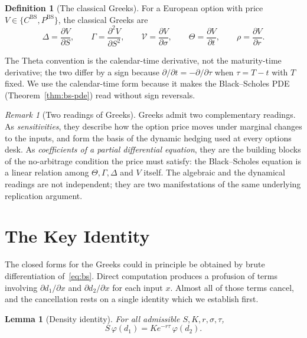 \documentclass[11pt,a4paper]{article}
\theoremstyle{plain}
\newtheorem{lemma}[theorem]{Lemma}
\theoremstyle{definition}
\newtheorem{definition}[theorem]{Definition}
\theoremstyle{remark}
\newtheorem{remark}[theorem]{Remark}
\newcommand{\BS}{\mathrm{BS}}
\newcommand{\Vega}{\mathcal{V}}
\begin{document}
\begin{definition}[The classical Greeks]
For a European option with price \(V \in \{C^{\BS}, P^{\BS}\}\), the
classical Greeks are
\[
    \Delta = \frac{\partial V}{\partial S},
    \qquad
    \Gamma = \frac{\partial^2 V}{\partial S^2},
    \qquad
    \Vega = \frac{\partial V}{\partial \sigma},
    \qquad
    \Theta = \frac{\partial V}{\partial t},
    \qquad
    \rho = \frac{\partial V}{\partial r}.
\]
\end{definition}

The Theta convention is the calendar-time derivative, not the
maturity-time derivative; the two differ by a sign because
\(\partial / \partial t = -\partial / \partial \tau\) when
\(\tau = T - t\) with \(T\) fixed. We use the calendar-time form
because it makes the Black--Scholes PDE
(Theorem~\ref{thm:bs-pde}) read without sign reversals.

\begin{remark}[Two readings of Greeks]
Greeks admit two complementary readings. As \emph{sensitivities},
they describe how the option price moves under marginal changes to
the inputs, and form the basis of the dynamic hedging used at every
options desk. As \emph{coefficients of a partial differential
equation}, they are the building blocks of the no-arbitrage condition
the price must satisfy: the Black--Scholes equation is a linear
relation among \(\Theta, \Gamma, \Delta\) and \(V\) itself. The
algebraic and the dynamical readings are not independent; they are
two manifestations of the same underlying replication argument.
\end{remark}

\section{The Key Identity}

The closed forms for the Greeks could in principle be obtained by
brute differentiation of~\eqref{eq:bs}. Direct computation produces a
profusion of terms involving \(\partial d_1 / \partial x\) and
\(\partial d_2 / \partial x\) for each input \(x\). Almost all of those
terms cancel, and the cancellation rests on a single identity which we
establish first.

\begin{lemma}[Density identity]
\label{lem:density-identity}
For all admissible \(S, K, r, \sigma, \tau\),
\begin{equation}
    S\, \varphi(d_1) = K e^{-r\tau}\, \varphi(d_2).
    \label{eq:density-identity}
\end{equation}
\end{lemma}
\end{document}
